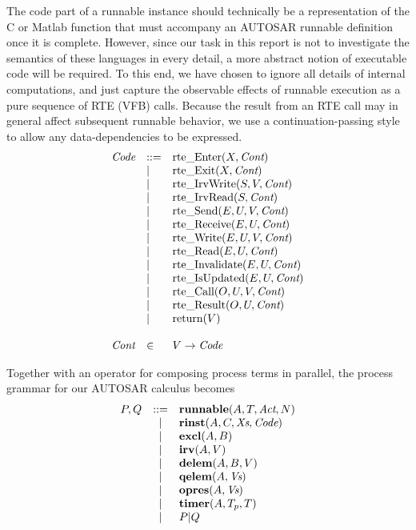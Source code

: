 \documentclass[twocolumn]{article}
\newcommand{\V}[1]{\text{\it #1}}
\newcommand{\Code} {\V{Code}}
\newcommand{\Cont} {\V{Cont}}
\newcommand{\Act}  {\V{Act}}
\newcommand{\Xs}   {\V{Xs}}
\newcommand{\Vs}   {\V{Vs}}
\newcommand{\kw}[1]{\textbf{#1}}
\newcommand{\runnable}[4]{\kw{runnable}(#1,#2,#3,#4)}
\newcommand{\rinst}   [4]{\kw{rinst}(#1,#2,#3,#4)}
\newcommand{\excl}    [2]{\kw{excl}(#1,#2)}
\newcommand{\irv}     [2]{\kw{irv}(#1,#2)}
\newcommand{\qelem}   [2]{\kw{qelem}(#1,#2)}
\newcommand{\delem}   [3]{\kw{delem}(#1,#2,#3)}
\newcommand{\opres}   [2]{\kw{opres}(#1,#2)}
\newcommand{\timer}   [3]{\kw{timer}(#1,#2, #3)}
\newcommand{\rte}[1]{\text{rte\_#1}}
\newcommand{\Enter}     [2]{\rte{Enter}(#1,#2)}
\newcommand{\Exit}      [2]{\rte{Exit}(#1,#2)}
\newcommand{\IrvWrite}  [3]{\rte{IrvWrite}(#1,#2,#3)}
\newcommand{\IrvRead}   [2]{\rte{IrvRead}(#1,#2)}
\newcommand{\Send}      [4]{\rte{Send}(#1,#2,#3,#4)}
\newcommand{\Receive}   [3]{\rte{Receive}(#1,#2,#3)}
\newcommand{\Write}     [4]{\rte{Write}(#1,#2,#3,#4)}
\newcommand{\Read}      [3]{\rte{Read}(#1,#2,#3)}
\newcommand{\Invalidate}[3]{\rte{Invalidate}(#1,#2,#3)}
\newcommand{\IsUpdated} [3]{\rte{IsUpdated}(#1,#2,#3)}
\newcommand{\Call}      [4]{\rte{Call}(#1,#2,#3,#4)}
\newcommand{\Result}    [3]{\rte{Result}(#1,#2,#3)}
\newcommand{\Return}    [1]{\text{return}(#1)}
\begin{document}
The code part of a runnable instance should technically be a representation of the C or Matlab function that must accompany an AUTOSAR runnable definition once it is complete. However, since our task in this report is not to investigate the semantics of these languages in every detail, a more abstract notion of executable code will be required. To this end, we have chosen to ignore all details of internal computations, and just capture the observable effects of runnable execution as a pure sequence of RTE (VFB) calls. Because the result from an RTE call may in general affect subsequent runnable behavior, we use a continuation-passing style to allow any data-dependencies to be expressed.
$$
\begin{array}{lll}
	\Code	& ::=	& \Enter{X}{\Cont}			\\
			& |	& \Exit{X}{\Cont}			\\
			& |	& \IrvWrite{S}{V}{\Cont}		\\
			& |	& \IrvRead{S}{\Cont}			\\
			& |	& \Send{E}{U}{V}{\Cont}		\\
			& |	& \Receive{E}{U}{\Cont}		\\
			& |	& \Write{E}{U}{V}{\Cont}		\\
			& |	& \Read{E}{U}{\Cont}		\\
			& |	& \Invalidate{E}{U}{\Cont}		\\
			& |	& \IsUpdated{E}{U}{\Cont}		\\
			& |	& \Call{O}{U}{V}{\Cont}		\\
			& |	& \Result{O}{U}{\Cont}		\\
			& |	& \Return{V}				\\
	\\
	\Cont	& \in	& V \rightarrow \Code		\\
\end{array}
$$

Together with an operator for composing process terms in parallel, the process grammar for our AUTOSAR calculus becomes
$$
\begin{array}{rcll}
	P,Q 	& ::= &
		\runnable{A}{T}{\Act}{N}	\\
		& | &
		\rinst{A}{C}{\Xs}{\Code}	\\
		& | &
		\excl{A}{B}			\\
		& | &
		\irv{A}{V}				\\
		& | &
		\delem{A}{B}{V}			\\
		& | &
		\qelem{A}{\Vs}			\\
		& | &
		\opres{A}{\Vs}			\\
		& | &
		\timer{A}{T_p}{T}		\\
		& | &
		P|Q					\\
\end{array}
$$
\end{document}
